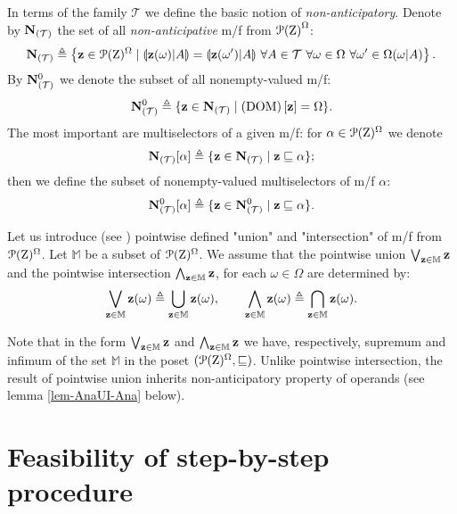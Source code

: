 \documentclass[sn-mathphys,Numbered,pdflatex]{sn-jnl}%
\theoremstyle{thmstyleone}%
\theoremstyle{thmstyletwo}%
\theoremstyle{thmstylethree}%
\newcommand{\beq}{\begin{equation}}
\newcommand{\eeq}{\end{equation}}
\newcommand{\mydef}{\mathrel{\triangleq}}%
\newcommand{\icP}[1]{\EuScript{P}({#1})}%
\newcommand{\myll}{\ensuremath{\forall}}%
\newcommand{\res}[2]{\ensuremath{(#1|#2)}}%
\newcommand{\myLe}{\mathrel{\sqsubseteq}}%
\newcommand{\naOm}{\ensuremath{\Omega}}%
\newcommand{\naZ}{\ensuremath{\mathrm{Z}}}%
\newcommand{\naTc}{\ensuremath{\mathcal{T}}}%
\newcommand{\naOmo}[2]{\naOm\setbox0=\hbox{\text{$#1$}}\ifdim\wd0=0pt\else\res{#1}{#2}\fi}%
\newcommand{\naN}{\AnaN{\naTc}{}}%
\newcommand{\naNo}[1]{\naN\setbox0=\hbox{\text{$#1$}}\ifdim\wd0=0pt\else[{#1}]\fi}%
\newcommand{\AnaN}[2]{\mathbf{N}_{(#1)}\setbox0=\hbox{\text{$#2$}}\ifdim\wd0=0pt\else\left[{#2}\right]\fi}%
\newcommand{\nado}[1]{(\mathrm{DOM})\setbox0=\hbox{\text{$#1$}}\ifdim\wd0=0pt\else\left[{#1}\right]\fi}%
\newcommand{\naNO}[1]{\naN^0\setbox0=\hbox{\text{$#1$}}\ifdim\wd0=0pt\else[{#1}]\fi}%
\newcommand{\sres}[2]{\llparenthesis#1|#2\rrparenthesis}%
\begin{document}
In terms of the family $\naTc$ we define the basic notion of \emph{non-anticipatory}.
Denote by $\naN$ the set of all \emph{non-anticipative} m/f from ${\icP\naZ}^\naOm$:
$$%
\naN\mydef\left\{{\bf z}\in\icP\naZ^\naOm\mid \sres{{\bf z}(\omega)}{A}=\sres{{\bf z}(\omega^ \prime)}{A}\ \myll A\in\naTc\ \myll\omega\in\naOm\ \myll\omega^\prime\in\naOmo\omega A\right\}.
$$%
By $\naNO{}$ we denote the subset of all nonempty-valued m/f:
$$%
\naNO{}\mydef\{{\bf z}\in\naN\mid\nado{{\bf z}}=\naOm\}.
$$%
The most important are multiselectors of a given m/f: for $\alpha\in\icP\naZ^\naOm$ we denote
\beq\label{nano-def}
\naNo\alpha\mydef\{{\bf z}\in\naN\mid{\bf z}\myLe\alpha\};
\eeq
then we define the subset of nonempty-valued multiselectors of m/f $\alpha$:
\beq\label{nanO-def}
\naNO\alpha\mydef\{{\bf z}\in\naNO{}\mid{\bf z}\myLe\alpha\}.
\eeq

Let us introduce (see \cite[\S\,3, item V]{Kura1966e}) pointwise defined "union" and "intersection" of m/f from $\icP\naZ^\naOm$.
Let $\mathbb{M}$ be a subset of $\icP\naZ^\naOm$.
We assume that the pointwise union $\bigvee_{{\bf z}\in\mathbb{M}}{{\bf z}}$ and the pointwise intersection $\bigwedge_{{\bf z}\in\mathbb{M}}{ {\bf z}}$, for each $\omega\in\naOm$ are determined by:
\beq\label{def-mfUI}
\bigvee_{{\bf z}\in\mathbb{M}}{\bf z}(\omega)\mydef\bigcup_{{\bf z}\in\mathbb{M}}{{\bf z}} (\omega),\qquad
\bigwedge_{{\bf z}\in\mathbb{M}}{\bf z}(\omega)\mydef\bigcap_{{\bf z}\in\mathbb{M}}{{\bf z}} (\omega).
\eeq

Note that in the form $\bigvee_{{\bf z}\in\mathbb{M}}{\bf z}$ and $\bigwedge_{{\bf z}\in\mathbb{M}}{\bf z }$ we have, respectively, supremum and  infimum of the set $\mathbb{M}$ in the poset $(\icP\naZ^\naOm,\myLe)$.
Unlike pointwise intersection, the result of pointwise union inherits non-anticipatory property of operands (see lemma \ref{lem-AnaUI-Ana} below).


\section{Feasibility of step-by-step procedure}
\label{Sbs-cont}
\end{document}
